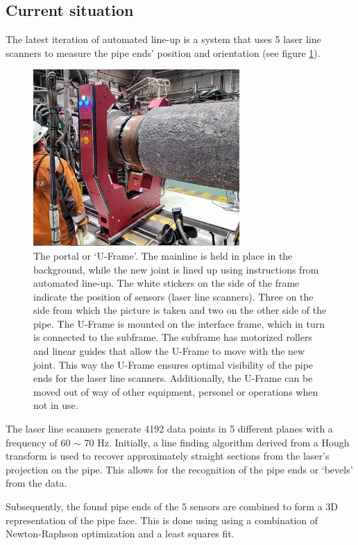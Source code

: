 \subsection{Current situation}
The latest iteration of automated line-up is a system that uses 5 laser line scanners to measure the pipe ends' position and orientation
(see figure \ref{fig:portal}).
\begin{figure}[H]
      \centering
      \includegraphics[width=0.7\textwidth]{images/side_view_final_lineup.jpg}
      \caption{The portal or `U-Frame'. The mainline is held in place in the background,
            while the new joint is lined up using instructions from automated line-up.
            The white stickers on the side of the frame indicate the position of sensors (laser line scanners). Three on the side from which the picture is taken and two on the other side of the pipe. The U-Frame is mounted on the interface frame, which in turn is connected to the subframe. The subframe has motorized rollers and linear guides that allow the U-Frame to move with the new joint. This way the U-Frame ensures optimal visibility of the pipe ends for the laser line scanners. Additionally, the U-Frame can be moved out of way of other equipment, personel or operations when not in use.}
      \label{fig:portal}
\end{figure}

The laser line scanners generate 4192 data points in 5 different planes with a frequency of 60 $\sim$ 70 Hz. Initially,
a line finding algorithm derived from a Hough transform \cite{hough_transform} is used to recover approximately
straight sections from the laser's projection on the pipe. This allows for the recognition of the pipe ends or `bevels'
from the data.

Subsequently, the found pipe ends of the 5 sensors are combined to form a 3D representation of the pipe face.
This is done using using a combination of Newton-Raphson optimization and a least squares fit.

